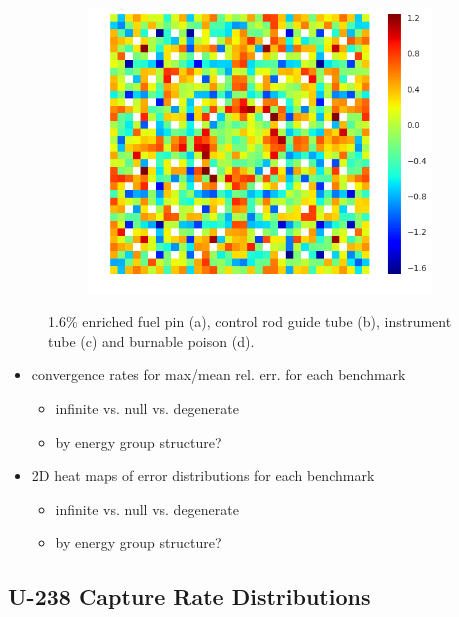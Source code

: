 \begin{figure}[h!]
\begin{subfigure}{.33\textwidth}
  \centering
  \includegraphics[width=\linewidth]{figures/quantification/2x2/degenerate-fiss-err-70}
  \caption{}
  \label{fig:chap8-2x2-degenerate-fiss-70}
\end{subfigure}
\caption[Fission rate errors for a 2$\times$2 colorset]{1.6\% enriched fuel pin (a), control rod guide tube (b), instrument tube (c) and burnable poison (d).}
\label{fig:chap8-2x2-fiss-err}
\end{figure}

\begin{itemize}[noitemsep]
  \item convergence rates for max/mean rel. err. for each benchmark
  \begin{itemize}[noitemsep]
    \item infinite vs. null vs. degenerate
    \item by energy group structure?
  \end{itemize}
  \item 2D heat maps of error distributions for each benchmark
  \begin{itemize}[noitemsep]
    \item infinite vs. null vs. degenerate
    \item by energy group structure?
  \end{itemize}
\end{itemize}

\subsection{U-238 Capture Rate Distributions}
\label{subsec:chap8-capt-rates}

